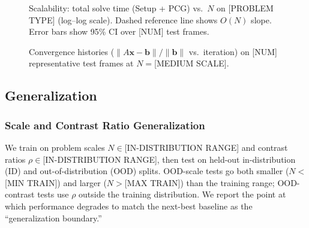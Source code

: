 \documentclass[acmtog,anonymous,review]{acmart}
\begin{document}
\begin{figure}[h]
  \centering
  \caption{Scalability: total solve time (Setup + PCG) vs.\ $N$ on [PROBLEM TYPE] (log--log scale).
    Dashed reference line shows $O(N)$ slope.  Error bars show 95\% CI over [NUM] test frames.
  }
  \label{fig:scalability}
\end{figure}

\begin{figure}[h]
  \centering
  \caption{Convergence histories ($\|A\mathbf{x} - \mathbf{b}\|/\|\mathbf{b}\|$ vs.\ iteration)
    on [NUM] representative test frames at $N = $[MEDIUM SCALE].
  }
  \label{fig:convergence}
\end{figure}

\subsection{Generalization}
\label{sec:results:generalization}

\subsubsection{Scale and Contrast Ratio Generalization}
\label{sec:results:gen:scale}

We train on problem scales $N \in $[IN-DISTRIBUTION RANGE] and contrast ratios
$\rho \in $[IN-DISTRIBUTION RANGE], then test on held-out in-distribution (ID) and
out-of-distribution (OOD) splits.  OOD-scale tests go both smaller ($N < $[MIN TRAIN]) and
larger ($N > $[MAX TRAIN]) than the training range; OOD-contrast tests use $\rho$ outside the
training distribution.  We report the point at which performance degrades to match the next-best
baseline as the ``generalization boundary.''
\end{document}
